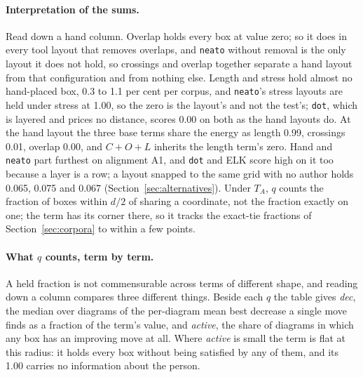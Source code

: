 \documentclass[11pt]{article}
\begin{document}
\paragraph{Interpretation of the sums.} Read down a hand column. Overlap holds every box
at value zero; so it does in every tool layout that removes overlaps, and \texttt{neato}
without removal is the only layout it does not hold, so crossings and overlap together
separate a hand layout from that configuration and from nothing else. Length and stress hold
almost no hand-placed box, 0.3 to 1.1 per cent per corpus, and \texttt{neato}'s stress
layouts are held under stress at 1.00, so
the zero is the layout's and not the test's; \texttt{dot}, which is layered and prices no
distance, scores 0.00 on both as the hand layouts do. At the hand layout the three base terms
share the energy as length 0.99, crossings 0.01, overlap 0.00, and $C+O+L$ inherits the
length term's zero. Hand and \texttt{neato} part furthest on alignment A1, and \texttt{dot}
and ELK score high on it too because a layer is a row; a layout snapped to the same grid
with no author
holds 0.065, 0.075 and 0.067 (Section~\ref{sec:alternatives}). Under $T_A$, $q$ counts
the fraction of boxes within $d/2$ of sharing a coordinate, not the fraction exactly on
one; the term has its corner there, so it tracks the exact-tie fractions of
Section~\ref{sec:corpora} to within a few points.

\paragraph{What $q$ counts, term by term.} A held fraction is not commensurable across
terms of different shape, and reading down a column compares three different things. Beside
each $q$ the table gives \emph{dec}, the median over diagrams of the per-diagram mean best
decrease a single move finds as a fraction of the term's value, and \emph{active}, the share of diagrams in which
any box has an improving move at all. Where \emph{active} is small the term is flat at this
radius: it holds every box without being satisfied by any of them, and its 1.00 carries no
information about the person.
\end{document}
